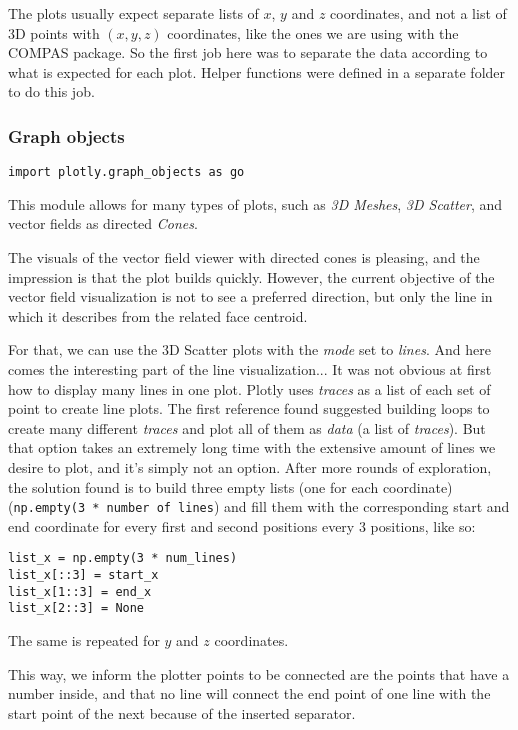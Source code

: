 The plots usually expect separate lists of $x$, $y$ and $z$ coordinates, and not a list of 3D points with $(x, y, z)$ coordinates, like the ones we are using with the COMPAS package. So the first job here was to separate the data according to what is expected for each plot. Helper functions were defined in a separate folder to do this job.

\subsubsection{Graph objects}

\begin{lstlisting}
import plotly.graph_objects as go
\end{lstlisting}

This module allows for many types of plots, such as \emph{3D Meshes}, \emph{3D Scatter}, and vector fields as directed \emph{Cones}. 

The visuals of the vector field viewer with directed cones is pleasing, and the impression is that the plot builds quickly. However, the current objective of the vector field visualization is not to see a preferred direction, but only the line in which it describes from the related face centroid.

For that, we can use the 3D Scatter plots with the \emph{mode} set to \emph{lines}. And here comes the interesting part of the line visualization... It was not obvious at first how to display many lines in one plot. Plotly uses \emph{traces} as a list of each set of point to create line plots. The first reference found suggested building loops to create many different \emph{traces} and plot all of them as \emph{data} (a list of \emph{traces}). But that option takes an extremely long time with the extensive amount of lines we desire to plot, and it's simply not an option. After more rounds of exploration, the solution found is to build three empty lists (one for each coordinate) (\lstinline{np.empty(3 * number of lines})  and fill them  with the corresponding start and end coordinate for every first and second positions every 3 positions, like so:

\begin{lstlisting}
list_x = np.empty(3 * num_lines)
list_x[::3] = start_x
list_x[1::3] = end_x
list_x[2::3] = None
\end{lstlisting}
The same is repeated for $y$ and $z$ coordinates.

This way, we inform the plotter points to be connected are the points that have a number inside, and that no line will connect the end point of one line with the start point of the next because of the inserted separator.


